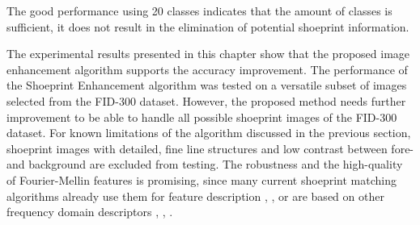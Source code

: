 \documentclass[draft,final]{vutinfth} %
\begin{document}
The good performance using 20 classes indicates that the amount of classes is sufficient, it does not result in the elimination of potential shoeprint information.
\par
The experimental results presented in this chapter show that the proposed image enhancement algorithm supports the accuracy improvement.
The performance of the Shoeprint Enhancement algorithm was tested on a versatile subset of images selected from the FID-300 dataset.
However, the proposed method needs further improvement to be able to handle all possible shoeprint images of the FID-300 dataset.
For known limitations of the algorithm discussed in the previous section, shoeprint images with detailed, fine line structures and low contrast between fore- and background are excluded from testing.
The robustness and the high-quality of Fourier-Mellin features is promising, since many current shoeprint matching algorithms already use them for feature description  \cite{gueham2008automatic}, \cite{richetelli2017classification}, \cite{wu2019crime} or are based on other frequency domain descriptors \cite{algarni2008novel}, \cite{wang2014automatic}, \cite{katireddy2017novel}.
\end{document}
